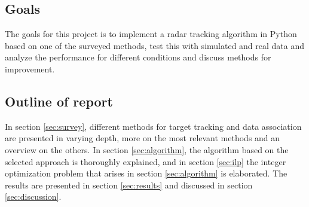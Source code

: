 \subsection{Goals}
The goals for this project is to implement a radar tracking algorithm in Python based on one of the surveyed methods, test this with simulated and real data and analyze the performance for different conditions and discuss methods for improvement.

\subsection{Outline of report}
In section \ref{sec:survey}, different methods for target tracking and data association are presented in varying depth, more on the most relevant methods and an overview on the others. In section \ref{sec:algorithm}, the algorithm based on the selected approach is thoroughly explained, and in section \ref{sec:ilp} the integer optimization problem that arises in section \ref{sec:algorithm} is elaborated. The results are presented in section \ref{sec:results} and discussed in section \ref{sec:discussion}.

